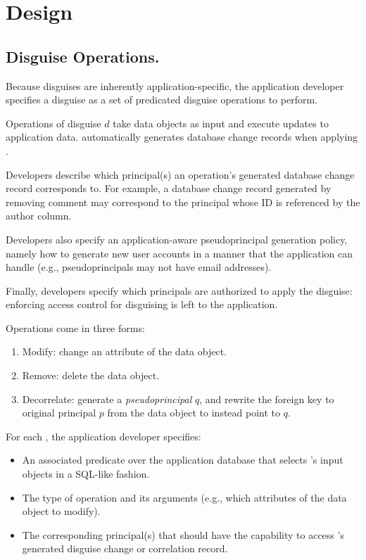 \section{Design} 

\subsection{Disguise Operations.} 
Because disguises are inherently application-specific, the application developer 
specifies a disguise as a 
set of predicated disguise operations  to perform.

Operations  of disguise $d$ take data objects as input and execute updates to application
data.  \sys automatically generates database change records when applying . 

Developers describe which principal(s) an operation's generated database change record corresponds
to. For example, a database change record generated by removing comment may correspond to the
principal whose ID is referenced by the author column.  

Developers also specify an application-aware pseudoprincipal generation policy, namely how to
generate new user accounts in a manner that the application can handle (e.g., pseudoprincipals may
not have email addresses).

Finally, developers specify which principals are authorized to apply the disguise: enforcing access
control for disguising is left to the application.  

\vspace{6pt}\noindent
Operations come in three forms:
\begin{enumerate}
    \item Modify: change an attribute of the data object.
    \item Remove: delete the data object.
    \item Decorrelate: generate a \emph{pseudoprincipal} $q$, and rewrite the foreign key to original
        principal $p$ from the data object to instead point to $q$.  
\end{enumerate}

\noindent For each , the application developer specifies:
\begin{itemize}
    \item An associated predicate over the application database that selects 's input
        objects in a SQL-like fashion.
    \item The type of operation and its arguments (e.g., which attributes of the data object to
        modify).
    \item The corresponding principal(s) that should have the capability to access 's
        generated disguise change or correlation record.
\end{itemize}

